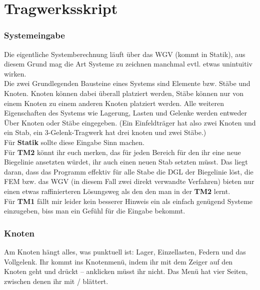 
\part{Tragwerksskript}

\section{Systemeingabe}

Die eigentliche Systemberechnung läuft über das WGV (kommt in Statik), aus diesem Grund mag die Art Systeme zu zeichnen manchmal evtl. etwas unintuitiv wirken.\\
Die zwei Grundlegenden Bausteine eines Systems sind Elemente bzw. Stäbe und Knoten.
Knoten können dabei überall platziert werden, Stäbe können nur von einem Knoten zu einem anderen Knoten platziert werden.
Alle weiteren Eigenschaften des Systems wie Lagerung, Lasten und Gelenke werden entweder Über Knoten oder Stäbe eingegeben. (Ein Einfeldträger hat also zwei Knoten und ein Stab, ein 3-Gelenk-Tragwerk hat drei knoten und zwei Stäbe.) \\
Für \textbf{Statik} sollte diese Eingabe Sinn machen.\\ 
Für \textbf{TM2} könnt ihr euch merken, das für jeden Bereich für den ihr eine neue Biegelinie ansetzten würdet, ihr auch einen neuen Stab setzten müsst. Das liegt daran, dass das Programm effektiv für alle Stabe die DGL der Biegelinie löst, die FEM bzw. das WGV (in diesem Fall zwei direkt verwandte Verfahren) bieten nur einen etwas raffinierteren Lösungsweg als den den man in der \textbf{TM2} lernt.\\
Für \textbf{TM1} fällt mir leider kein besserer Hinweis ein als einfach genügend Systeme einzugeben, biss man ein Gefühl für die Eingabe bekommt. 



\section{Knoten}

Am Knoten hängt alles, was punktuell ist: Lager, Einzellasten, Federn und das Vollgelenk. Ihr
kommt ins Knotenmenü, indem ihr mit dem Zeiger auf den Knoten geht und  drückt --
anklicken müsst ihr nicht. Das Menü hat vier Seiten, zwischen denen ihr mit
\taste{$\leftarrow$}/\taste{$\rightarrow$} blättert.

